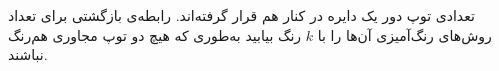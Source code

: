 \EXERCISE
تعدادی توپ دور یک دایره در کنار هم قرار گرفته‌اند. رابطه‌ی بازگشتی برای تعداد روش‌های رنگ‌آمیزی آن‌ها را با
$k$
رنگ بیابید به‌طوری که هیچ دو توپ مجاوری هم‌رنگ نباشند.